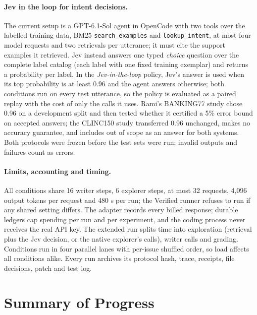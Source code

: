 \documentclass{article}
\begin{document}
\paragraph{Jev in the loop for intent decisions.}
The current setup is a GPT-6.1-Sol agent in OpenCode with two tools over the labelled training data, BM25 \texttt{search\_examples} and \texttt{lookup\_intent}, at most four model requests and two retrievals per utterance; it must cite the support examples it retrieved. Jev instead answers one typed \emph{choice} question over the complete label catalog (each label with one fixed training exemplar) and returns a probability per label. In the \emph{Jev-in-the-loop} policy, Jev's answer is used when its top probability is at least 0.96 and the agent answers otherwise; both conditions run on every test utterance, so the policy is evaluated as a paired replay with the cost of only the calls it uses. Rami's BANKING77 study chose 0.96 on a development split and then tested whether it certified a 5\% error bound on accepted answers; the CLINC150 study transferred 0.96 unchanged, makes no accuracy guarantee, and includes out of scope as an answer for both systems. Both protocols were frozen before the test sets were run; invalid outputs and failures count as errors.

\paragraph{Limits, accounting and timing.}
All conditions share 16 writer steps, 6 explorer steps, at most 32 requests, 4,096 output tokens per request and 480 s per run; the Verified runner refuses to run if any shared setting differs. The adapter records every billed response; durable ledgers cap spending per run and per experiment, and the coding process never receives the real API key. The extended run splits time into exploration (retrieval plus the Jev decision, or the native explorer's calls), writer calls and grading. Conditions run in four parallel lanes with per-issue shuffled order, so load affects all conditions alike. Every run archives its protocol hash, trace, receipts, file decisions, patch and test log.

\section{Summary of Progress}
\end{document}
